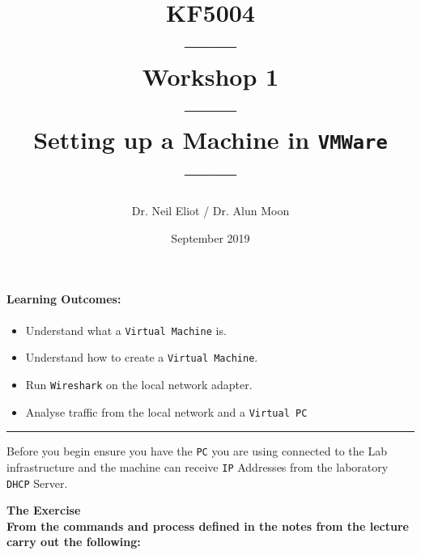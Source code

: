 \documentclass[11pt]{article}
\begin{document}
\author{Dr. Neil Eliot / Dr. Alun Moon}
\title{KF5004\\------\\Workshop 1\\------\\Setting up a Machine in \texttt{VMWare}\\------}
\date{September 2019}
\maketitle

\newpage



\paragraph{Learning Outcomes:}
\begin{itemize}
\item Understand what a \texttt{Virtual Machine} is.
\item Understand how to create a \texttt{Virtual Machine}.
\item Run \texttt{Wireshark} on the local network adapter.
\item Analyse traffic from the local network and a \texttt{Virtual PC}
\end{itemize}

\begin{center}
\noindent\rule{8cm}{0.4pt}
\end{center}

\begin{tcolorbox}[title={\textbf{Note:}}]
    Before you begin ensure you have the \texttt{PC} you are using connected to the Lab infrastructure and the machine can receive \texttt{IP} Addresses from the laboratory \texttt{DHCP} Server.
\end{tcolorbox}

\noindent\textbf{The Exercise}\\

\noindent\textbf{From the commands and process defined in the notes from the lecture carry out the following:}
\end{document}
